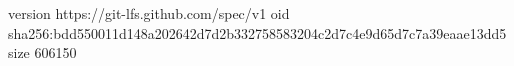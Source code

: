 version https://git-lfs.github.com/spec/v1
oid sha256:bdd550011d148a202642d7d2b332758583204c2d7c4e9d65d7c7a39eaae13dd5
size 606150
